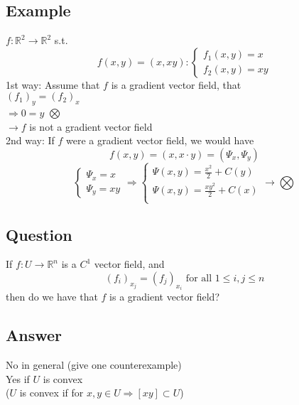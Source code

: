 \documentclass[12pt]{article}
\newcommand*\circled[1]{\tikz[baseline=(char.base)]{
    \node[shape=circle,draw,inner sep=2pt] (char) {#1};}}
\newcommand{\BR}{\mathbb R}
\begin{document}
\subsection*{Example}
  $f:\BR^2\rightarrow\BR^2$ s.t. \\
  \begin{equation*}
    f(x,y)=(x,xy):
    \begin{cases}
      f_1(x,y)=x \\
      f_2(x,y)=xy
    \end{cases}
  \end{equation*}
  1st way: Assume that $f$ is a gradient vector field, that \\
  $(f_1)_y=(f_2)_x$ \\
  $\Rightarrow0=y$ $\bigotimes$ \\
  $\rightarrow f$ is not a gradient vector field \\
  2nd way: If $f$ were a gradient vector field, we would have \\
  \[ f(x,y)=(x,x\cdot y)=(\Psi_x,\Psi_y) \]
  \begin{equation*}
    \begin{cases}
      \Psi_x=x \\
      \Psi_y=xy
    \end{cases}\Rightarrow
    \begin{cases}
      \Psi(x,y)=\frac{x^2}{2}+C(y) \\
      \Psi(x,y)=\frac{xy^2}{2}+C(x) \\
    \end{cases}
    \rightarrow \bigotimes
  \end{equation*}
\subsection*{Question}
  If $f:U\rightarrow\BR^n$ is a $C^1$ vector field, and \\
  \[ (f_i)_{x_j}=(f_j)_{x_i}\text{ for all } 1\leq i,j\leq n \]
  then do we have that $f$ is a gradient vector field? \\
\subsection*{Answer}
  \circled{1} No in general (give one counterexample) \\
  \circled{2} Yes if $U$ is convex \\
  ($U$ is convex if for $x,y\in U\Rightarrow[xy]\subset U$) \\
\end{document}
